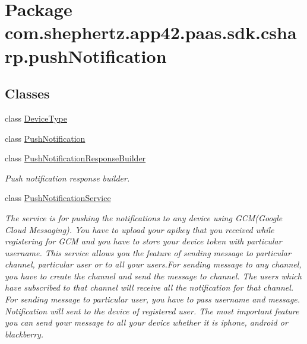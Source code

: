 \hypertarget{namespacecom_1_1shephertz_1_1app42_1_1paas_1_1sdk_1_1csharp_1_1push_notification}{\section{Package com.\+shephertz.\+app42.\+paas.\+sdk.\+csharp.\+push\+Notification}
\label{namespacecom_1_1shephertz_1_1app42_1_1paas_1_1sdk_1_1csharp_1_1push_notification}
}
\subsection*{Classes}
\begin{DoxyCompactItemize}
\item 
class \hyperlink{classcom_1_1shephertz_1_1app42_1_1paas_1_1sdk_1_1csharp_1_1push_notification_1_1_device_type}{Device\+Type}
\item 
class \hyperlink{classcom_1_1shephertz_1_1app42_1_1paas_1_1sdk_1_1csharp_1_1push_notification_1_1_push_notification}{Push\+Notification}
\item 
class \hyperlink{classcom_1_1shephertz_1_1app42_1_1paas_1_1sdk_1_1csharp_1_1push_notification_1_1_push_notification_response_builder}{Push\+Notification\+Response\+Builder}
\begin{DoxyCompactList}\small\item\em Push notification response builder. \end{DoxyCompactList}\item 
class \hyperlink{classcom_1_1shephertz_1_1app42_1_1paas_1_1sdk_1_1csharp_1_1push_notification_1_1_push_notification_service}{Push\+Notification\+Service}
\begin{DoxyCompactList}\small\item\em The service is for pushing the notifications to any device using G\+C\+M(\+Google Cloud Messaging). You have to upload your apikey that you received while registering for G\+C\+M and you have to store your device token with particular username. This service allows you the feature of sending message to particular channel, particular user or to all your users.\+For sending message to any channel, you have to create the channel and send the message to channel. The users which have subscribed to that channel will receive all the notification for that channel. For sending message to particular user, you have to pass username and message. Notification will sent to the device of registered user. The most important feature you can send your message to all your device whether it is iphone, android or blackberry. \end{DoxyCompactList}\end{DoxyCompactItemize}
